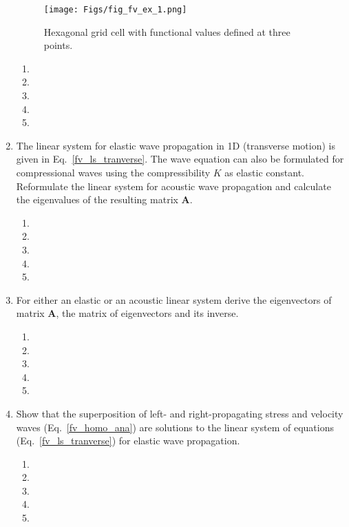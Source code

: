 \begin{enumerate}
 \begin{figure}
\begin{center}
\texttt{[image: Figs/fig\_fv\_ex\_1.png]}
\end{center}
\caption{Hexagonal grid cell with functional values defined at three points.} 
\label{fig_fv_ex_1}
\end{figure}
\begin{enumerate}
\item[]
\item[]
\item[] 
\item[]
\item[] 
\end{enumerate}
\item
The linear system for elastic wave propagation in 1D (transverse motion) is given in Eq.~\ref{fv_ls_tranverse}. The wave equation can also be formulated for compressional waves using the compressibility $K$ as elastic constant. Reformulate the linear system for acoustic wave propagation and calculate the eigenvalues of the resulting  matrix $\mathbf{A}$.
\begin{enumerate}
\item[]
\item[]
\item[] 
\item[]
\item[] 
\end{enumerate}
\item
For either an elastic or an acoustic linear system derive the eigenvectors of  matrix $\mathbf{A}$, the matrix of eigenvectors and its inverse. 
\begin{enumerate}
\item[]
\item[]
\item[] 
\item[]
\item[] 
\end{enumerate}
\item
Show that the superposition of left- and right-propagating stress and velocity waves (Eq.~\ref{fv_homo_ana}) are solutions to the linear system of equations (Eq.~\ref{fv_ls_tranverse}) for elastic wave propagation. 
\begin{enumerate}
\item[]
\item[]
\item[] 
\item[]
\item[] 

\end{enumerate}
\end{enumerate}
